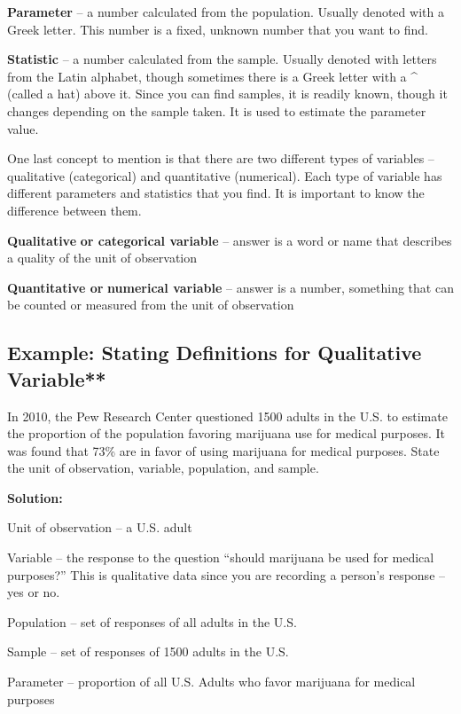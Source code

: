 \documentclass[
]{book}
\begin{document}
\textbf{Parameter} -- a number calculated from the population. Usually denoted with a Greek letter. This number is a fixed, unknown number that you want to find.

\textbf{Statistic} -- a number calculated from the sample. Usually denoted with letters from the Latin alphabet, though sometimes there is a Greek letter with a \^{} (called a hat) above it. Since you can find samples, it is readily known, though it changes depending on the sample taken. It is used to estimate the parameter value.

One last concept to mention is that there are two different types of variables -- qualitative (categorical) and quantitative (numerical). Each type of variable has different parameters and statistics that you find. It is important to know the difference between them.

\textbf{Qualitative} \textbf{or categorical variable} -- answer is a word or name that describes a quality of the unit of observation

\textbf{Quantitative or} \textbf{numerical variable} -- answer is a number, something that can be counted or measured from the unit of observation

\hypertarget{example-stating-definitions-for-qualitative-variable}{%
\subsection{Example: Stating Definitions for Qualitative Variable**}\label{example-stating-definitions-for-qualitative-variable}}

In 2010, the Pew Research Center questioned 1500 adults in the U.S. to estimate the proportion of the population favoring marijuana use for medical purposes. It was found that 73\% are in favor of using marijuana for medical purposes. State the unit of observation, variable, population, and sample.

\textbf{Solution:}

Unit of observation -- a U.S. adult

Variable -- the response to the question ``should marijuana be used for medical purposes?'' This is qualitative data since you are recording a person's response -- yes or no.

Population -- set of responses of all adults in the U.S.

Sample -- set of responses of 1500 adults in the U.S.

Parameter -- proportion of all U.S. Adults who favor marijuana for medical purposes
\end{document}
